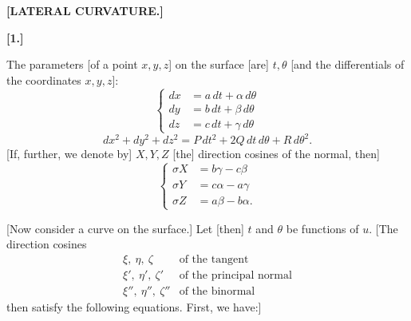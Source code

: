 \clearpage
{}%
\begin{center}\bfseries [LATERAL CURVATURE.]\end{center}
\begin{center}\bfseries [1.]\end{center}
\noindent\hspace*{1.2em}The parameters [of a point $x,y,z$] on the surface [are] $t,\theta$ [and the differentials of the coordinates $x,y,z$]:
\begin{equation}\tag*{[1]}
\left\{\begin{aligned}
dx&=a\,dt+\alpha\,d\theta\\
dy&=b\,dt+\beta\,d\theta\\
dz&=c\,dt+\gamma\,d\theta
\end{aligned}\right.
\end{equation}
\begin{equation}\tag*{[2]}
dx^2+dy^2+dz^2=P\,dt^2+2Q\,dt\,d\theta+R\,d\theta^2.
\end{equation}
[If, further, we denote by] $X,Y,Z$ [the] direction cosines of the normal, then]
\begin{equation}\tag*{[3]}
\left\{\begin{aligned}
\sigma X&=b\gamma-c\beta\\
\sigma Y&=c\alpha-a\gamma\\
\sigma Z&=a\beta-b\alpha.
\end{aligned}\right.
\end{equation}

[Now consider a curve on the surface.] Let [then] $t$ and $\theta$ be functions of $u$. [The direction cosines
\[
\begin{array}{cl}
\xi,\ \eta,\ \zeta&\text{of the tangent}\\
\xi',\ \eta',\ \zeta'&\text{of the principal normal}\\
\xi'',\ \eta'',\ \zeta''&\text{of the binormal}
\end{array}
\]
then satisfy the following equations. First, we have:]
